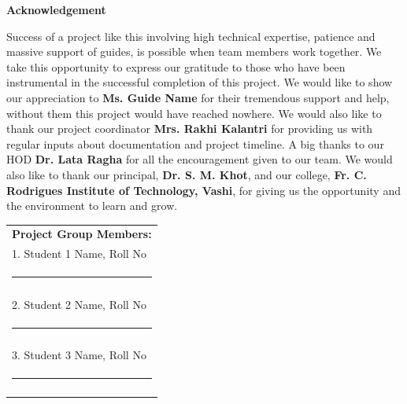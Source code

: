 
\begin{centering}
    \large
{\LARGE\bf Acknowledgement}\\
\end{centering}
    
\justify
Success of a project like this involving high technical expertise, patience and massive support of guides, is possible when team members work together. We take this opportunity to express our gratitude to those who have been instrumental in the successful completion of this project. We would like to show our appreciation to \textbf{Ms. Guide Name} for their tremendous support and help, without them this project would have reached nowhere. We would also like to thank our project coordinator \textbf{Mrs. Rakhi Kalantri} for providing us with regular inputs about documentation and project timeline. A big thanks to our HOD \textbf{Dr. Lata Ragha} for all the encouragement given to our team. We would also like to thank our principal, \textbf{Dr. S. M. Khot}, and our college, \textbf{Fr. C. Rodrigues Institute of Technology, Vashi}, for giving us the opportunity and the environment to learn and grow.

\vspace{3cm}
\hfill%
\begin{tabular}[t]{l@{}}
\vspace{1cm}

{\textbf{Project Group Members:}} \\ 
\vspace{1cm}

1. Student 1 Name, Roll No \\
\noindent\rule{5cm}{0.10pt} \\
\\
\vspace{1cm}

2. Student 2 Name, Roll No \\
\noindent\rule{5cm}{0.10pt} \\
\\
\vspace{1cm}

3. Student 3 Name, Roll No \\
 \noindent\rule{5cm}{0.10pt}
\\
\vspace{1cm}
\end{tabular}

